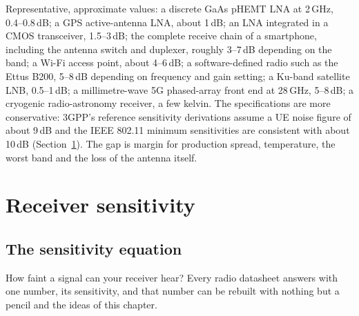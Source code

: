 \begin{inpractice}
Representative, approximate values: a discrete GaAs pHEMT LNA at 2\,GHz, 0.4--0.8\,dB; a GPS active-antenna
LNA, about 1\,dB; an LNA integrated in a CMOS transceiver, 1.5--3\,dB; the complete receive chain of a
smartphone, including the antenna switch and duplexer, roughly 3--7\,dB depending on the band; a Wi-Fi
access point, about 4--6\,dB; a software-defined radio such as the Ettus B200, 5--8\,dB depending on frequency
and gain setting; a Ku-band satellite LNB, 0.5--1\,dB; a millimetre-wave 5G phased-array front end at
28\,GHz, 5--8\,dB; a cryogenic radio-astronomy receiver, a few kelvin. The specifications are more
conservative: 3GPP's reference sensitivity derivations assume a UE noise figure of about 9\,dB and the IEEE
802.11 minimum sensitivities are consistent with about 10\,dB (Section~\ref{sec:ch03:sensitivity}). The gap
is margin for production spread, temperature, the worst band and the loss of the antenna itself.
\end{inpractice}


\section{Receiver sensitivity}
\label{sec:ch03:sensitivity}

\subsection{The sensitivity equation}

How faint a signal can your receiver hear? Every radio datasheet answers with one number, its
sensitivity, and that number can be rebuilt with nothing but a pencil and the ideas of this chapter.

